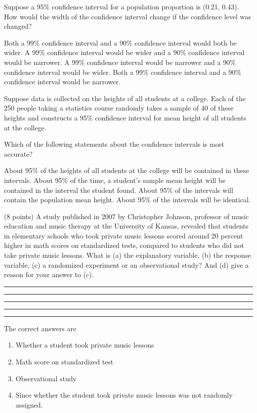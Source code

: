 \documentclass{article}
\begin{document}
\begin{mcquestions}
		\question Suppose a 95\% confidence interval for a population proportion is (0.21, 0.43). How would the width of the confidence interval change if the confidence level was changed?
		\begin{mcanswerslist}
			\answer Both a 99\% confidence interval and a 90\% confidence interval would both be wider.
			\answer[correct] A 99\% confidence interval would be wider and a 90\% confidence interval would be narrower.
			\answer A 99\% confidence interval would be narrower and a 90\% confidence interval would be wider.
			\answer Both a 99\% confidence interval and a 90\% confidence interval would be narrower.
		\end{mcanswerslist}
		
		\question Suppose data is collected on the heights of all students at a college.  Each of the 250 people taking a statistics course randomly takes a sample of 40 of these heights and constructs a 95\% confidence interval for mean height of all students at the college.
		
		Which of the following statements about the confidence intervals is most accurate?
		\begin{mcanswerslist}
			\answer About 95\% of the heights of all students at the college will be contained in these intervals.
			\answer About 95\% of the time, a student's sample mean height will be contained in the interval the student found.
			\answer[correct] About 95\% of the intervals will contain the population mean height.
			\answer About 95\% of the intervals will be identical.
		\end{mcanswerslist}
		
		\question (8 points) A study published in 2007 by Christopher Johnson, professor of music education and music therapy at the University of Kansas, revealed that students in elementary schools who took private music lessons scored around 20 percent higher in math scores on standardized tests, compared to students who did not take private music lessons.  What is (a) the explanatory variable, (b) the response variable, (c) a randomized experiment or an observational study? And (d) give a reason for your answer to (c).
		\begin{mcanswerslist}[permutenone]
			\answer \rule{\textwidth}{0.5 pt}
			\answer \rule{\textwidth}{0.5 pt}
			\answer \rule{\textwidth}{0.5 pt}
			\answer \rule{\textwidth}{0.5 pt}
			\rule{\textwidth}{0.5 pt}
		\end{mcanswerslist}
		\begin{mcexplanation}
			The correct answers are
			\begin{enumerate}[label=(\alph*)]
				\item Whether a student took private music lessons
				\item Math score on standardized test
				\item Observational study
				\item Since whether the student took private music lessons was not randomly assigned.
			\end{enumerate}
		\end{mcexplanation}
		

\end{mcquestions}
\end{document}
